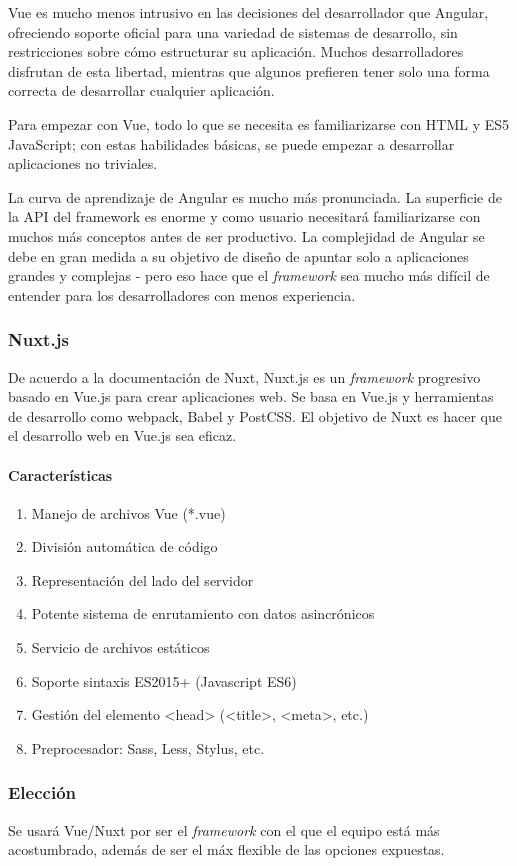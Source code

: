 Vue es mucho menos intrusivo en las decisiones del desarrollador que Angular, ofreciendo soporte oficial para una variedad de sistemas de desarrollo, sin restricciones sobre cómo estructurar su aplicación. Muchos desarrolladores disfrutan de esta libertad, mientras que algunos prefieren tener solo una forma correcta de desarrollar cualquier aplicación.


Para empezar con Vue, todo lo que se necesita es familiarizarse con HTML y ES5 JavaScript; con estas habilidades básicas, se puede empezar a desarrollar aplicaciones no triviales.


La curva de aprendizaje de Angular es mucho más pronunciada. La superficie de la API del framework es enorme y como usuario necesitará familiarizarse con muchos más conceptos antes de ser productivo. La complejidad de Angular se debe en gran medida a su objetivo de diseño de apuntar solo a aplicaciones grandes y complejas - pero eso hace que el \textit{framework} sea mucho más difícil de entender para los desarrolladores con menos experiencia.

\subsubsection*{Nuxt.js}
De acuerdo a la documentación de Nuxt\cite{noauthor_what_nodate-1}, Nuxt.js es un \textit{framework} progresivo basado en Vue.js para crear aplicaciones web. Se basa en Vue.js y herramientas de desarrollo como webpack, Babel y PostCSS. El objetivo de Nuxt es hacer que el desarrollo web en Vue.js sea eficaz.

\paragraph*{Características}
\begin{enumerate}
    \item Manejo de archivos Vue (*.vue)
    \item División automática de código
    \item Representación del lado del servidor
    \item Potente sistema de enrutamiento con datos asincrónicos
    \item Servicio de archivos estáticos
    \item Soporte sintaxis ES2015+ (Javascript ES6)
    \item Gestión del elemento <head> (<title>, <meta>, etc.)
    \item Preprocesador: Sass, Less, Stylus, etc.
\end{enumerate}



\subsubsection*{Elección}

Se usará Vue/Nuxt por ser el \textit{framework} con el que el equipo está más acostumbrado, además de ser el máx flexible de las opciones expuestas.